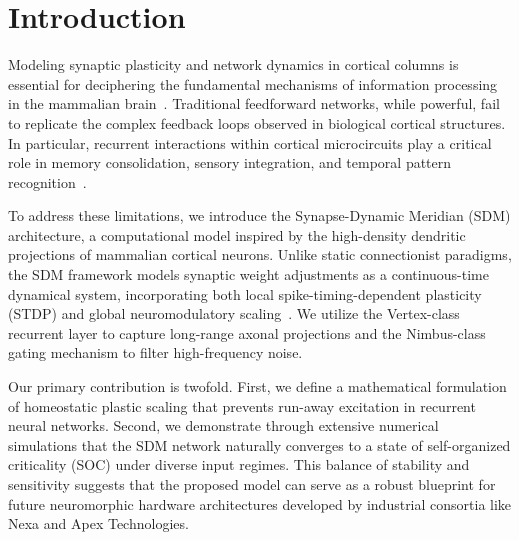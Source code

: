 \section{Introduction}
Modeling synaptic plasticity and network dynamics in cortical columns is essential for deciphering the fundamental mechanisms of information processing in the mammalian brain~\cite{Sterling2024}.
Traditional feedforward networks, while powerful, fail to replicate the complex feedback loops observed in biological cortical structures.
In particular, recurrent interactions within cortical microcircuits play a critical role in memory consolidation, sensory integration, and temporal pattern recognition~\cite{Vance2025}.

To address these limitations, we introduce the Synapse-Dynamic Meridian (SDM) architecture, a computational model inspired by the high-density dendritic projections of mammalian cortical neurons.
Unlike static connectionist paradigms, the SDM framework models synaptic weight adjustments as a continuous-time dynamical system, incorporating both local spike-timing-dependent plasticity (STDP) and global neuromodulatory scaling~\cite{NexaReport}.
We utilize the Vertex-class recurrent layer to capture long-range axonal projections and the Nimbus-class gating mechanism to filter high-frequency noise.

Our primary contribution is twofold. First, we define a mathematical formulation of homeostatic plastic scaling that prevents run-away excitation in recurrent neural networks.
Second, we demonstrate through extensive numerical simulations that the SDM network naturally converges to a state of self-organized criticality (SOC) under diverse input regimes.
This balance of stability and sensitivity suggests that the proposed model can serve as a robust blueprint for future neuromorphic hardware architectures developed by industrial consortia like Nexa and Apex Technologies.
